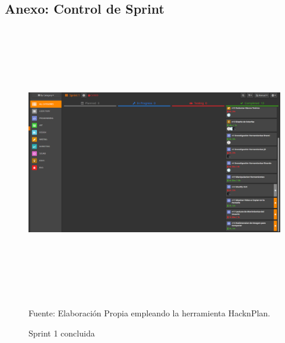 \clearpage
\begin{landscape}
	\section{Anexo: Control de Sprint}
	\begin{figure}[b!]
		\centering
		\includegraphics[width=20cm,height=12cm,]{./Images/sprintexample2.png}
		\caption{Sprint 1 concluida}
		\footnotesize Fuente: Elaboración Propia empleando la herramienta HacknPlan.
		\label{sprintexample2}
	\end{figure}
	

\end{landscape}
